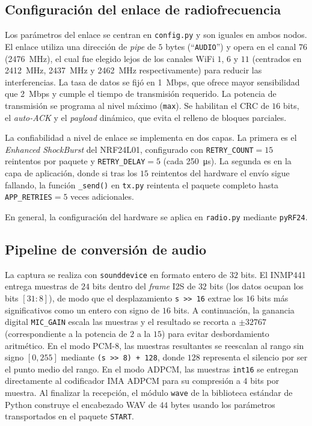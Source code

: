 \subsection{Configuración del enlace de radiofrecuencia}

Los parámetros del enlace se centran en \texttt{config.py} y son iguales en ambos nodos.
El enlace utiliza una dirección de \textit{pipe} de $5$ bytes (``\texttt{AUDIO}'') y opera en el canal $76$ (\SI{2476}{\mega\hertz}), el cual fue elegido lejos de los canales WiFi $1$, $6$ y $11$ (centrados en \SI{2412}{\mega\hertz}, \SI{2437}{\mega\hertz} y \SI{2462}{\mega\hertz} respectivamente) para reducir las interferencias.
La tasa de datos se fijó en \SI{1}{Mbps}, que ofrece mayor sensibilidad que \SI{2}{Mbps} y cumple el tiempo de transmisión requerido.
La potencia de transmisión se programa al nivel máximo (\texttt{max}).
Se habilitan el CRC de $16$ bits, el \textit{auto-ACK} y el \textit{payload} dinámico, que evita el relleno de bloques parciales.

La confiabilidad a nivel de enlace se implementa en dos capas.
La primera es el \textit{Enhanced ShockBurst} del NRF24L01, configurado con \texttt{RETRY\_COUNT}$= 15$ reintentos por paquete y \texttt{RETRY\_DELAY}$= 5$ (cada \SI{250}{\micro\second}).
La segunda es en la capa de aplicación, donde si tras los $15$ reintentos del hardware el envío sigue fallando, la función \texttt{\_send()} en \texttt{tx.py} reintenta el paquete completo hasta \texttt{APP\_RETRIES}$= 5$ veces adicionales.

En general, la configuración del hardware se aplica en \texttt{radio.py} mediante \texttt{pyRF24}.

\subsection{Pipeline de conversión de audio}

La captura se realiza con \texttt{sounddevice} en formato entero de $32$ bits.
El INMP441 entrega muestras de $24$ bits dentro del \textit{frame} I2S de $32$ bits (los datos ocupan los bits $[31{:}8]$), de modo que el desplazamiento \texttt{s >{}> 16} extrae los $16$ bits más significativos como un entero con signo de $16$ bits.
A continuación, la ganancia digital \texttt{MIC\_GAIN} escala las muestras y el resultado se recorta a $\pm 32767$ (correspondiente a la potencia de $2$ a la $15$) para evitar desbordamiento aritmético.
En el modo PCM-8, las muestras resultantes se reescalan al rango sin signo $[0, 255]$ mediante \texttt{(s >{}> 8) + 128}, donde $128$ representa el silencio por ser el punto medio del rango.
En el modo ADPCM, las muestras \texttt{int16} se entregan directamente al codificador IMA ADPCM para su compresión a $4$ bits por muestra.
Al finalizar la recepción, el módulo \texttt{wave} de la biblioteca estándar de Python construye el encabezado WAV de $44$ bytes usando los parámetros transportados en el paquete \texttt{START}.

